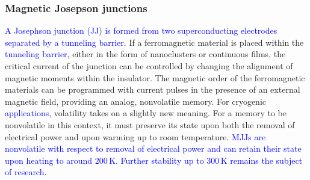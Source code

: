 \documentclass[twocolumn]{article}
\begin{document}
\subsubsection{Magnetic Josepson junctions}
\textcolor{blue}{A Josephson junction (JJ) is formed from two superconducting electrodes separated by a tunneling barrier.} If a ferromagnetic material is placed within the \textcolor{blue}{tunneling barrier}, either in the form of nanoclusters or continuous films, the critical current of the junction can be controlled by changing the alignment of magnetic moments within the insulator. The magnetic order of the ferromagnetic materials can be programmed with current pulses in the presence of an external magnetic field, providing an analog, nonvolatile memory. For cryogenic \textcolor{blue}{applications}, volatility takes on a slightly new meaning. For a memory to be nonvolatile in this context, it must preserve its state upon both the removal of electrical power and upon warming up to room temperature. \textcolor{blue}{MJJs are nonvolatile with respect to removal of electrical power and can retain their state upon heating to around 200\,K. Further stability up to 300\,K remains the subject of research.} 
\end{document}
